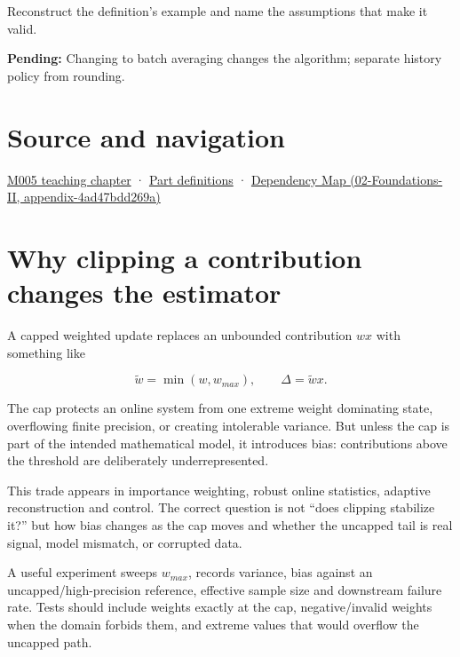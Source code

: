 Reconstruct the definition's example and name the assumptions that make it valid.

\textbf{Pending:} Changing to batch averaging changes the algorithm; separate history policy from rounding.

\section{Source and navigation}\label{appendix-1e45d0613db3-source-and-navigation}

\href{Continuous\%20Notes/Computing\%20Foundations\%20-\%20From\%20Bits\%20to\%20C++\%20and\%20Systems\%20APIs\#When\%20arithmetic\%20meets\%20uncertainty}{M005 teaching chapter} · \hyperref[appendix-fd090d982a15-m005---parts-77-88]{Part definitions} · \href{../02-Foundations-II/main.pdf\#nameddest=appendix-4ad47bdd269a}{Dependency Map (02-Foundations-II, appendix-4ad47bdd269a)}

\section{Why clipping a contribution changes the estimator}\label{appendix-1e45d0613db3-why-clipping-a-contribution-changes-the-estimator}

A capped weighted update replaces an unbounded contribution \(w x\) with something like

\[
\tilde w = \min(w,w_{max}),
\qquad
\Delta = \tilde w x.
\]

The cap protects an online system from one extreme weight dominating state, overflowing finite precision, or creating intolerable variance. But unless the cap is part of the intended mathematical model, it introduces bias: contributions above the threshold are deliberately underrepresented.

This trade appears in importance weighting, robust online statistics, adaptive reconstruction and control. The correct question is not ``does clipping stabilize it?'' but how bias changes as the cap moves and whether the uncapped tail is real signal, model mismatch, or corrupted data.

A useful experiment sweeps \(w_{max}\), records variance, bias against an uncapped/high-precision reference, effective sample size and downstream failure rate. Tests should include weights exactly at the cap, negative/invalid weights when the domain forbids them, and extreme values that would overflow the uncapped path.
